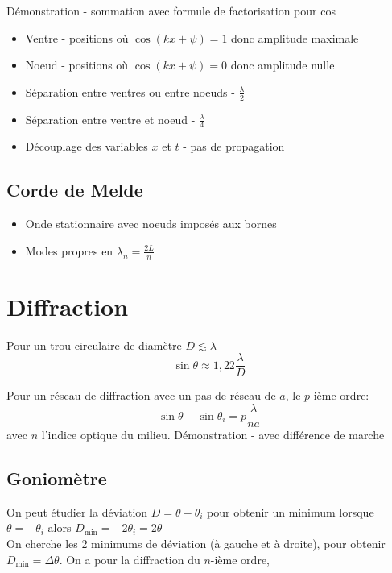 \documentclass[openany]{book}
\begin{document}
\noindent Démonstration - sommation avec formule de factorisation pour cos

\begin{itemize}
    \item Ventre - positions où $\cos{(kx + \psi)} = 1$ donc amplitude maximale
    \item Noeud - positions où $\cos{(kx + \psi)} = 0$ donc amplitude nulle 
    \item Séparation entre ventres ou entre noeuds - $ \frac{\lambda}{2} $
    \item Séparation entre ventre et noeud - $ \frac{\lambda}{4} $
    \item Découplage des variables $x$ et $t$ - pas de propagation
\end{itemize}

\subsection{Corde de Melde}
\begin{itemize}
    \item Onde stationnaire avec noeuds imposés aux bornes
    \item Modes propres en $\lambda_n = \frac{2L}{n}$
\end{itemize}

\section{Diffraction}
Pour un trou circulaire de diamètre $ D \lesssim \lambda $
\[ \sin{\theta} \approx 1,22 \frac{\lambda}{D} \]

\noindent
Pour un réseau de diffraction avec un pas de réseau de $a$, le $p$-ième ordre:
\[ \sin \theta - \sin \theta_i = p \frac{\lambda}{na} \]
\noindent avec $n$ l'indice optique du milieu. Démonstration - avec différence de marche

\subsection{Goniomètre}

On peut étudier la déviation $D = \theta - \theta_i$ pour obtenir un minimum lorsque $ \theta = -\theta_i $ alors $ D_{\text{min}} = -2\theta_i = 2\theta $ \\

On cherche les 2 minimums de déviation (à gauche et à droite), pour obtenir $D_{\text{min}} = \Delta \theta$. On a pour la diffraction du $n$-ième ordre,
\end{document}
